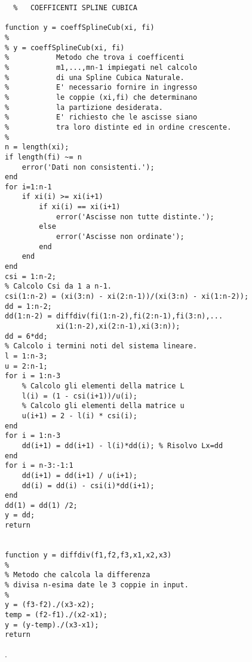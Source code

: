\documentclass[a4paper]{report}
\begin{document}
\newpage
\begin{lstlisting}	%	COEFFICENTI SPLINE CUBICA 

function y = coeffSplineCub(xi, fi)
%
% y = coeffSplineCub(xi, fi)
%           Metodo che trova i coefficenti
%           m1,...,mn-1 impiegati nel calcolo 
%           di una Spline Cubica Naturale.
%           E' necessario fornire in ingresso 
%           le coppie (xi,fi) che determinano
%           la partizione desiderata.
%           E' richiesto che le ascisse siano
%           tra loro distinte ed in ordine crescente.
%
n = length(xi);
if length(fi) ~= n
	error('Dati non consistenti.');
end
for i=1:n-1
	if xi(i) >= xi(i+1)
		if xi(i) == xi(i+1)
			error('Ascisse non tutte distinte.');
		else
			error('Ascisse non ordinate');
		end
	end
end
csi = 1:n-2;
% Calcolo Csi da 1 a n-1.
csi(1:n-2) = (xi(3:n) - xi(2:n-1))/(xi(3:n) - xi(1:n-2));
dd = 1:n-2;
dd(1:n-2) = diffdiv(fi(1:n-2),fi(2:n-1),fi(3:n),...
			xi(1:n-2),xi(2:n-1),xi(3:n));
dd = 6*dd;
% Calcolo i termini noti del sistema lineare.
l = 1:n-3;
u = 2:n-1;
for i = 1:n-3
	% Calcolo gli elementi della matrice L
	l(i) = (1 - csi(i+1))/u(i);
	% Calcolo gli elementi della matrice u
	u(i+1) = 2 - l(i) * csi(i);
end
for i = 1:n-3
	dd(i+1) = dd(i+1) - l(i)*dd(i); % Risolvo Lx=dd
end
for i = n-3:-1:1
	dd(i+1) = dd(i+1) / u(i+1);
	dd(i) = dd(i) - csi(i)*dd(i+1);
end
dd(1) = dd(1) /2;
y = dd;
return


function y = diffdiv(f1,f2,f3,x1,x2,x3)
%
% Metodo che calcola la differenza
% divisa n-esima date le 3 coppie in input.
%
y = (f3-f2)./(x3-x2);
temp = (f2-f1)./(x2-x1);
y = (y-temp)./(x3-x1);
return

\end{lstlisting}
.\\
\end{document}
